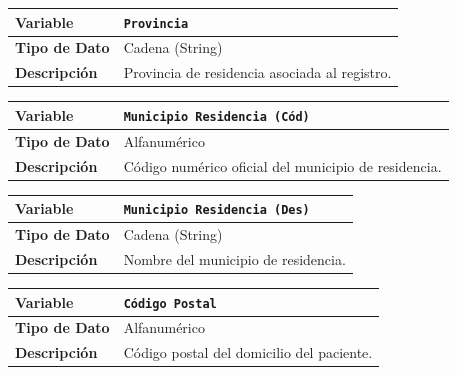 \documentclass[12pt,a4paper,onecolumn,oneside]{report}
\begin{document}
\noindent
\begin{tabular}{|p{3.5cm}|p{10.5cm}|}
\hline
\rowcolor[RGB]{239,239,239} 
\textbf{Variable} & \textbf{\texttt{Provincia}} \\ \hline
\textbf{Tipo de Dato} & Cadena (String) \\ \hline
\textbf{Descripción} & Provincia de residencia asociada al registro. \\ \hline
\end{tabular}
\label{tab:var_provincia}
\vspace{0.4cm}

\noindent
\begin{tabular}{|p{3.5cm}|p{10.5cm}|}
\hline
\rowcolor[RGB]{239,239,239} 
\textbf{Variable} & \textbf{\texttt{Municipio Residencia (Cód)}} \\ \hline
\textbf{Tipo de Dato} & Alfanumérico \\ \hline
\textbf{Descripción} & Código numérico oficial del municipio de residencia. \\ \hline
\end{tabular}
\label{tab:var_municipio_residencia_cod}
\vspace{0.4cm}

\noindent
\begin{tabular}{|p{3.5cm}|p{10.5cm}|}
\hline
\rowcolor[RGB]{239,239,239} 
\textbf{Variable} & \textbf{\texttt{Municipio Residencia (Des)}} \\ \hline
\textbf{Tipo de Dato} & Cadena (String) \\ \hline
\textbf{Descripción} & Nombre del municipio de residencia. \\ \hline
\end{tabular}
\label{tab:var_municipio_residencia_des}
\vspace{0.4cm}

\noindent
\begin{tabular}{|p{3.5cm}|p{10.5cm}|}
\hline
\rowcolor[RGB]{239,239,239} 
\textbf{Variable} & \textbf{\texttt{Código Postal}} \\ \hline
\textbf{Tipo de Dato} & Alfanumérico \\ \hline
\textbf{Descripción} & Código postal del domicilio del paciente. \\ \hline
\end{tabular}
\label{tab:var_codigo_postal}
\vspace{0.6cm}
\end{document}
